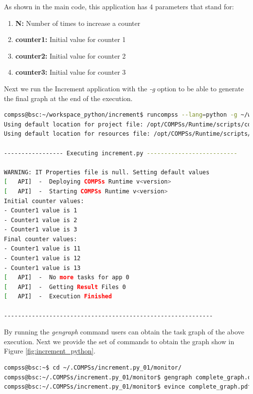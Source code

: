 As shown in the main code, this application has 4 parameters that stand for:

\begin{enumerate}
 \item \textbf{N:} Number of times to increase a counter
 \item \textbf{counter1:} Initial value for counter 1
 \item \textbf{counter2:} Initial value for counter 2
 \item \textbf{counter3:} Initial value for counter 3
\end{enumerate}

Next we run the Increment application with the \textit{-g} option to be able to generate the final graph at the end of the execution.

\begin{lstlisting}[language=bash]
compss@bsc:~/workspace_python/increment$ runcompss --lang=python -g ~/workspace_python/increment/increment.py 10 1 2 3
Using default location for project file: /opt/COMPSs/Runtime/scripts/configuration/xml/projects/project.xml
Using default location for resources file: /opt/COMPSs/Runtime/scripts/configuration/xml/resources/resources.xml

----------------- Executing increment.py --------------------------

WARNING: IT Properties file is null. Setting default values
[   API]  -  Deploying COMPSs Runtime v<version>
[   API]  -  Starting COMPSs Runtime v<version>
Initial counter values:
- Counter1 value is 1
- Counter1 value is 2
- Counter1 value is 3
Final counter values:
- Counter1 value is 11
- Counter1 value is 12
- Counter1 value is 13
[   API]  -  No more tasks for app 0
[   API]  -  Getting Result Files 0
[   API]  -  Execution Finished

------------------------------------------------------------
\end{lstlisting}

By running the \textit{gengraph} command users can obtain the task graph of the above execution. Next we provide the set of commands
to obtain the graph show in Figure \ref{fig:increment_python}.

\begin{lstlisting}[language=bash]
compss@bsc:~$ cd ~/.COMPSs/increment.py_01/monitor/
compss@bsc:~/.COMPSs/increment.py_01/monitor$ gengraph complete_graph.dot
compss@bsc:~/.COMPSs/increment.py_01/monitor$ evince complete_graph.pdf
\end{lstlisting}

